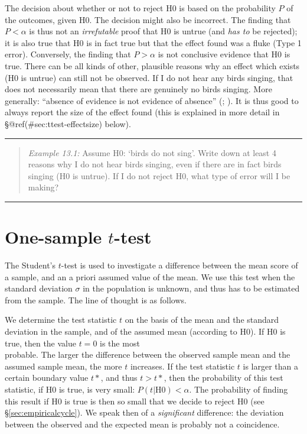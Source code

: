 \documentclass[
]{book}
\begin{document}
The decision about whether or not to reject H0 is based on the probability
\(P\) of the outcomes, given H0. The decision might also be
incorrect. The finding that \(P < \alpha\) is thus not an
\emph{irrefutable} proof that H0 is untrue (and \emph{has to} be
rejected); it is also true that H0 is in fact true but that the
effect found was a fluke (Type 1 error). Conversely, the finding
that \(P > \alpha\) is not conclusive evidence that H0 is true. There can
be all kinds of other, plausible reasons why an effect which exists (H0 is untrue)
can still not be observed. If I do not hear any birds singing, that does not necessarily
mean that there are genuinely no birds singing. More generally: ``absence of evidence is not
evidence of absence'' (; ). It is thus good to always report the size
of the effect found (this is explained in more detail in
§@ref(\#sec:ttest-effectsize) below).

\begin{center}\rule{0.5\linewidth}{0.5pt}\end{center}

\begin{quote}
\emph{Example 13.1:}
Assume H0: `birds do not sing'. Write
down at least 4 reasons why I do not hear birds singing, even
if there are in fact birds singing (H0 is untrue). If I do not reject H0,
what type of error will I be making?
\end{quote}

\begin{center}\rule{0.5\linewidth}{0.5pt}\end{center}

\hypertarget{sec:ttest-onesample}{%
\section{\texorpdfstring{One-sample \(t\)-test}{One-sample t-test}}\label{sec:ttest-onesample}}

The Student's \(t\)-test is used to investigate a difference
between the mean score of a sample, and an a priori assumed value
of the mean. We use this test when the standard deviation
\(\sigma\) in the population is unknown, and thus has to be estimated from
the sample. The line of thought is as follows.

We determine the test statistic \(t\) on the basis of the mean and the
standard deviation in the sample, and of the assumed mean (according to H0).
If H0 is true, then the value \(t=0\) is the most\\
probable. The larger the difference between the observed sample mean and the
assumed sample mean, the more \(t\) increases. If the test statistic \(t\) is larger than
a certain boundary value \(t*\), and thus \(t>t*\), then the probability of this test statistic,
if H0 is true, is very small: \(P(t|\textrm{H0}) < \alpha\). The probability of finding this result
if H0 is true is then so small that we decide to reject H0
(see §\ref{sec:empiricalcycle}). We speak then of a \emph{significant} difference:
the deviation between the observed and the expected mean is probably not a
coincidence.
\end{document}
